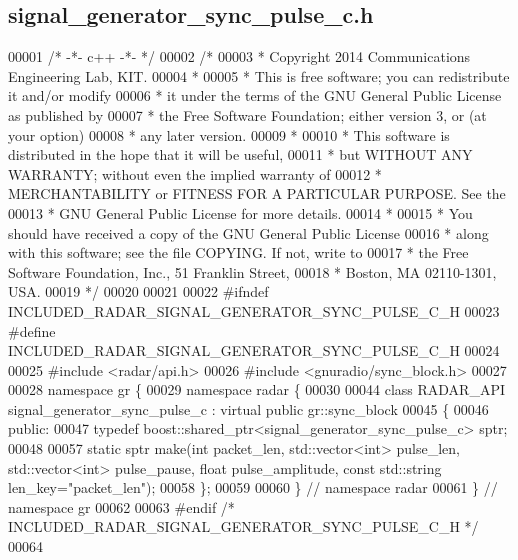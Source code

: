 \subsection{signal\+\_\+generator\+\_\+sync\+\_\+pulse\+\_\+c.\+h}
\label{signal__generator__sync__pulse__c_8h_source}

\begin{DoxyCode}
00001 \textcolor{comment}{/* -*- c++ -*- */}
00002 \textcolor{comment}{/* }
00003 \textcolor{comment}{ * Copyright 2014 Communications Engineering Lab, KIT.}
00004 \textcolor{comment}{ * }
00005 \textcolor{comment}{ * This is free software; you can redistribute it and/or modify}
00006 \textcolor{comment}{ * it under the terms of the GNU General Public License as published by}
00007 \textcolor{comment}{ * the Free Software Foundation; either version 3, or (at your option)}
00008 \textcolor{comment}{ * any later version.}
00009 \textcolor{comment}{ * }
00010 \textcolor{comment}{ * This software is distributed in the hope that it will be useful,}
00011 \textcolor{comment}{ * but WITHOUT ANY WARRANTY; without even the implied warranty of}
00012 \textcolor{comment}{ * MERCHANTABILITY or FITNESS FOR A PARTICULAR PURPOSE.  See the}
00013 \textcolor{comment}{ * GNU General Public License for more details.}
00014 \textcolor{comment}{ * }
00015 \textcolor{comment}{ * You should have received a copy of the GNU General Public License}
00016 \textcolor{comment}{ * along with this software; see the file COPYING.  If not, write to}
00017 \textcolor{comment}{ * the Free Software Foundation, Inc., 51 Franklin Street,}
00018 \textcolor{comment}{ * Boston, MA 02110-1301, USA.}
00019 \textcolor{comment}{ */}
00020 
00021 
00022 \textcolor{preprocessor}{#ifndef INCLUDED\_RADAR\_SIGNAL\_GENERATOR\_SYNC\_PULSE\_C\_H}
00023 \textcolor{preprocessor}{#define INCLUDED\_RADAR\_SIGNAL\_GENERATOR\_SYNC\_PULSE\_C\_H}
00024 
00025 \textcolor{preprocessor}{#include <radar/api.h>}
00026 \textcolor{preprocessor}{#include <gnuradio/sync\_block.h>}
00027 
00028 \textcolor{keyword}{namespace }gr \{
00029   \textcolor{keyword}{namespace }radar \{
00030 
00044     \textcolor{keyword}{class }RADAR_API signal_generator_sync_pulse_c : \textcolor{keyword}{virtual} \textcolor{keyword}{public} gr::sync\_block
00045     \{
00046      \textcolor{keyword}{public}:
00047       \textcolor{keyword}{typedef} boost::shared\_ptr<signal\_generator\_sync\_pulse\_c> sptr;
00048 
00057       \textcolor{keyword}{static} sptr make(\textcolor{keywordtype}{int} packet\_len, std::vector<int> pulse\_len, std::vector<int> pulse\_pause, \textcolor{keywordtype}{float} 
      pulse\_amplitude, \textcolor{keyword}{const} std::string len\_key=\textcolor{stringliteral}{"packet\_len"});
00058     \};
00059 
00060   \} \textcolor{comment}{// namespace radar}
00061 \} \textcolor{comment}{// namespace gr}
00062 
00063 \textcolor{preprocessor}{#endif }\textcolor{comment}{/* INCLUDED\_RADAR\_SIGNAL\_GENERATOR\_SYNC\_PULSE\_C\_H */}\textcolor{preprocessor}{}
00064 
\end{DoxyCode}
